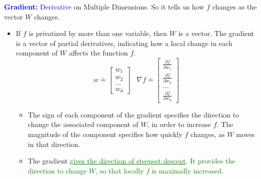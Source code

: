 \documentclass[12pt, a4paper]{article}
\begin{document}
\textbf{\textcolor{blue}{Gradient}:} \textcolor{blue}{Derivative} on Multiple Dimensions. So it tells us how $f$ changes as the vector $W$ changes.
\begin{itemize}
  \item If $f$ is privatized by more than one variable, then $W$ is a vector. The gradient is a vector of partial derivatives, indicating how a local change in each component of $W$ affects the function $f$.
  $$
  w \doteq \begin{bmatrix}
                  w_{1} \\
                  w_{2} \\
                  ... \\
                  w_{d}
            \end{bmatrix} \;\;\;
  \nabla f \doteq \begin{bmatrix}
                  \frac{\partial f}{\partial w_{1}} \\
                  \frac{\partial f}{\partial w_{2}} \\
                  ... \\
                  \frac{\partial f}{\partial w_{d}}
                  \end{bmatrix}
  $$
  \begin{itemize}
    \item The sign of each component of the gradient specifies the direction to change the associated component of $W$, in order to increase $f$. The magnitude of the component specifies how quickly $f$ changes, as $W$ moves in that direction.
    \item The gradient \textcolor{Green}{\uline{gives the direction of steepest descent}. It provides the direction to change $W$, so that locally $f$ is maximally increased}.
  \end{itemize}
\end{itemize}
\end{document}
